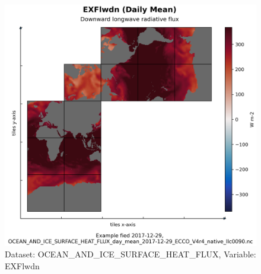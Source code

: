 \begin{figure}[H]
\centering
\includegraphics[scale=0.55]{../images/plots/native_plots/Ocean_and_Sea-Ice_Surface_Heat_Fluxes/EXFlwdn.png}
\caption{Dataset: OCEAN\_AND\_ICE\_SURFACE\_HEAT\_FLUX, Variable: EXFlwdn}
\label{tab:table-OCEAN_AND_ICE_SURFACE_HEAT_FLUX_EXFlwdn-Plot}
\end{figure}
\pagebreak
